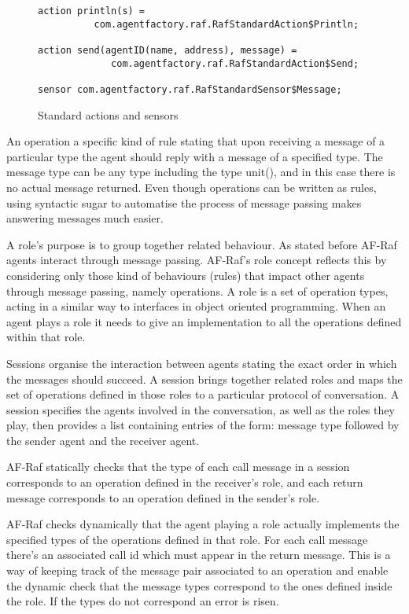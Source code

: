 \documentclass[a4paper,12pt,oneside,fleqn]{book} %
\theoremstyle{plain}
\theoremstyle{definition}
\theoremstyle{remark}
\begin{document}
\begin{figure}\footnotesize %
\begin{verbatim}
action println(s) = 
          com.agentfactory.raf.RafStandardAction$Println;

action send(agentID(name, address), message) = 
             com.agentfactory.raf.RafStandardAction$Send;

sensor com.agentfactory.raf.RafStandardSensor$Message;
\end{verbatim}
\caption{Standard actions and sensors}
\label{fig:actions-sensors}
\end{figure} %


An operation a specific kind of rule stating that upon receiving a message
of a particular type the agent should reply with a message of a specified
type. The message type can be any type including the type unit(), and in
this case there is no actual message returned. Even though operations can
be written as rules, using syntactic sugar to automatise the process of
message passing makes answering messages much easier.

A role's purpose is to group together related behaviour. As stated before
AF-Raf agents interact through message passing. AF-Raf's role concept
reflects this by considering only those kind of behaviours (rules) that
impact other agents through message passing, namely operations. A role is a
set of operation types, acting in a similar way to interfaces in object
oriented programming. When an agent plays a role it needs to give an
implementation to all the operations defined within that role.

Sessions organise the interaction between agents stating the exact order in
which the messages should succeed. A session brings together related roles
and maps the set of operations defined in those roles to a particular
protocol of conversation. A session specifies the agents involved in the
conversation, as well as the roles they play, then provides a list
containing entries of the form: message type followed by the sender agent
and the receiver agent.

AF-Raf statically checks that the type of each call message in a session
corresponds to an operation defined in the receiver's role, and each return
message corresponds to an operation defined in the sender's role.

AF-Raf checks dynamically that the agent playing a role actually implements
the specified types of the operations defined in that role.  For each call
message there's an associated call id which must appear in the return
message. This is a way of keeping track of the message pair associated to
an operation and enable the dynamic check that the message types correspond
to the ones defined inside the role. If the types do not correspond an
error is risen.
\end{document}
